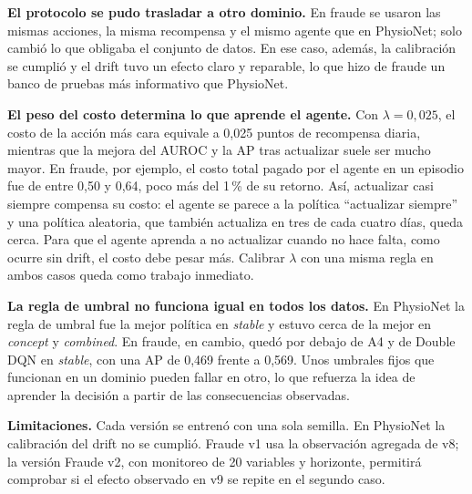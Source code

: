 \textbf{El protocolo se pudo trasladar a otro dominio.} En fraude se usaron las mismas acciones,
la misma recompensa y el mismo agente que en PhysioNet; solo cambió lo que obligaba el conjunto
de datos. En ese caso, además, la calibración se cumplió y el drift tuvo un efecto claro y
reparable, lo que hizo de fraude un banco de pruebas más informativo que PhysioNet.

\textbf{El peso del costo determina lo que aprende el agente.} Con $\lambda = 0{,}025$, el costo
de la acción más cara equivale a 0,025 puntos de recompensa diaria, mientras que la mejora del
AUROC y la AP tras actualizar suele ser mucho mayor. En fraude, por ejemplo, el costo total
pagado por el agente en un episodio fue de entre 0,50 y 0,64, poco más del 1\,\% de su retorno.
Así, actualizar casi siempre compensa su costo: el agente se parece a la política
``actualizar siempre'' y una política aleatoria, que también actualiza en tres de cada cuatro
días, queda cerca. Para que el agente aprenda a no actualizar cuando no hace falta, como ocurre
sin drift, el costo debe pesar más. Calibrar $\lambda$ con una misma regla en ambos casos queda
como trabajo inmediato.

\textbf{La regla de umbral no funciona igual en todos los datos.} En PhysioNet la regla de
umbral fue la mejor política en \textit{stable} y estuvo cerca de la mejor en \textit{concept} y
\textit{combined}. En fraude, en cambio, quedó por debajo de A4 y de Double DQN en
\textit{stable}, con una AP de 0,469 frente a 0,569. Unos umbrales fijos que funcionan en un
dominio pueden fallar en otro, lo que refuerza la idea de aprender la decisión a partir de las
consecuencias observadas.

\textbf{Limitaciones.} Cada versión se entrenó con una sola semilla. En PhysioNet la calibración
del drift no se cumplió. Fraude v1 usa la observación agregada de v8; la versión Fraude v2, con
monitoreo de 20 variables y horizonte, permitirá comprobar si el efecto observado en v9 se repite
en el segundo caso.
